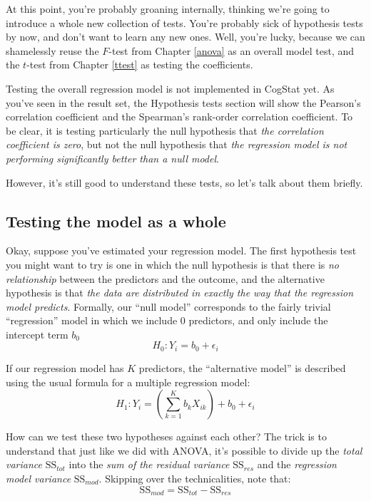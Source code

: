 \documentclass[
]{book}
\theoremstyle{definition}
\theoremstyle{definition}
\theoremstyle{definition}
\theoremstyle{definition}
\theoremstyle{remark}
\begin{document}
At this point, you're probably groaning internally, thinking we're going to introduce a whole new collection of tests. You're probably sick of hypothesis tests by now, and don't want to learn any new ones. Well, you're lucky, because we can shamelessly reuse the \(F\)-test from Chapter \ref{anova} as an overall model test, and the \(t\)-test from Chapter \ref{ttest} as testing the coefficients.

Testing the overall regression model is not implemented in CogStat yet. As you've seen in the result set, the Hypothesis tests section will show the Pearson's correlation coefficient and the Spearman's rank-order correlation coefficient. To be clear, it is testing particularly the null hypothesis that \emph{the correlation coefficient is zero}, but not the null hypothesis that \emph{the regression model is not performing significantly better than a null model}.

However, it's still good to understand these tests, so let's talk about them briefly.

\hypertarget{testing-the-model-as-a-whole}{%
\subsection{Testing the model as a whole}\label{testing-the-model-as-a-whole}}

Okay, suppose you've estimated your regression model. The first hypothesis test you might want to try is one in which the null hypothesis is that there is \emph{no relationship} between the predictors and the outcome, and the alternative hypothesis is that \emph{the data are distributed in exactly the way that the regression model predicts}. Formally, our ``null model'' corresponds to the fairly trivial ``regression'' model in which we include 0 predictors, and only include the intercept term \(b_0\)
\[
H_0: Y_i = b_0 + \epsilon_i
\]

If our regression model has \(K\) predictors, the ``alternative model'' is described using the usual formula for a multiple regression model:
\[
H_1: Y_i = \left( \sum_{k=1}^K b_{k} X_{ik} \right) + b_0 + \epsilon_i
\]

How can we test these two hypotheses against each other? The trick is to understand that just like we did with ANOVA, it's possible to divide up the \emph{total variance} \(\mbox{SS}_ {tot}\) into the \emph{sum of the residual variance} \(\mbox{SS}_ {res}\) and the \emph{regression model variance} \(\mbox{SS}_ {mod}\). Skipping over the technicalities, note that:
\[
\mbox{SS}_{mod} = \mbox{SS}_{tot} - \mbox{SS}_{res}
\]
\end{document}

